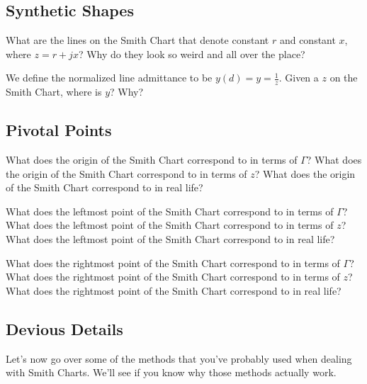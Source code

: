 \documentclass{article}
\begin{document}
\subsection{Synthetic Shapes}

What are the lines on the Smith Chart that denote constant $r$ and constant $x$, where $z = r + jx$? Why do they look so weird and all over the place?

We define the normalized line admittance to be $y(d) = y = \frac{1}{z}$. Given a $z$ on the Smith Chart, where is $y$? Why?

\vspace{5cm}

\subsection{Pivotal Points}

What does the origin of the Smith Chart correspond to in terms of $\Gamma$? What does the origin of the Smith Chart correspond to in terms of $z$? What does the origin of the Smith Chart correspond to in real life?

What does the leftmost point of the Smith Chart correspond to in terms of $\Gamma$? What does the leftmost point of the Smith Chart correspond to in terms of $z$? What does the leftmost point of the Smith Chart correspond to in real life?

What does the rightmost point of the Smith Chart correspond to in terms of $\Gamma$? What does the rightmost point of the Smith Chart correspond to in terms of $z$? What does the rightmost point of the Smith Chart correspond to in real life?

\newpage

\subsection{Devious Details}

Let's now go over some of the methods that you've probably used when dealing with Smith Charts. We'll see if you know why those methods actually work.
\end{document}

